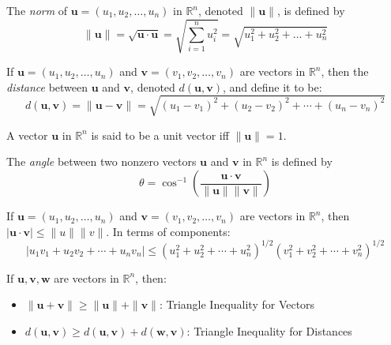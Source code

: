 \documentclass{report}
\begin{document}
		\begin{defn}
			The \emph{norm} of $\bm{u}=(u_1,u_2,\dots,u_n)$ in $\mathbb{R}^n$, denoted $\|\bm{u}\|$, is defined by
			\begin{displaymath}
			\|\bm{u}\|=\sqrt{\bm{u} \cdot \bm{u}}=\sqrt{\sum_{i=1}^{n}u_i^2}=\sqrt{u_1^2+u_2^2+\dots+u_n^2}
			\end{displaymath}
		\end{defn}
		
		\begin{defn}
			If $\bm{u}=(u_1,u_2,\dots,u_n)$ and $\bm{v}=(v_1,v_2,\dots,v_n)$ are vectors in $\mathbb{R}^n$, then the \emph{distance} between $\bm{u}$ and $\bm{v}$, denoted $d(\bm{u},\bm{v})$, and define it to be:
			\begin{displaymath}
				d(\bm{u},\bm{v})=\|\bm{u}-\bm{v}\|=\sqrt{(u_1-v_1)^2+(u_2-v_2)^2+\cdots+(u_n-v_n)^2}
			\end{displaymath}
		\end{defn}
		
		\begin{defn}
			A vector $\bm{u}$ in $\mathbb{R}^n$ is said to be a unit vector iff $\|\bm{u}\|=1$.
		\end{defn}
		
		\begin{defn}[Angle]
			The \emph{angle} between two nonzero vectors $\bm{u}$ and $\bm{v}$ in $\mathbb{R}^n$ is defined by
			\begin{displaymath}
				\theta=\cos^{-1}(\frac{\bm{u}\cdot\bm{v}}{\|\bm{u}\|\|\bm{v}\|})
			\end{displaymath}
		\end{defn}
		
		\begin{thm}
			If $\bm{u}=(u_1,u_2,\dots,u_n)$ and $\bm{v}=(v_1,v_2,\dots,v_n)$ are vectors in $\mathbb{R}^n$, then $\left|\bm{u}\cdot\bm{v}\right| \le \|u\|\|v\|$. In terms of components:
			\begin{displaymath}
				\left|u_1v_1+u_2v_2+\cdots+u_nv_n\right| \le \left(u_1^2+u_2^2+\cdots+u_n^2\right)^{1/2} \left(v_1^2+v_2^2+\cdots+v_n^2\right)^{1/2}
			\end{displaymath}
		\end{thm}
		
		\begin{thm}
			If $\bm{u}, \bm{v}, \bm{w}$ are vectors in $\mathbb{R}^n$, then:
			\begin{itemize}
				\item $\|\bm{u}+\bm{v}\| \ge \|\bm{u}\|+\|\bm{v}\|$: Triangle Inequality for Vectors
				\item $d(\bm{u},\bm{v}) \ge d(\bm{u},\bm{v})+d(\bm{w},\bm{v})$: Triangle Inequality for Distances
			\end{itemize}
		\end{thm}
		
\end{document}
